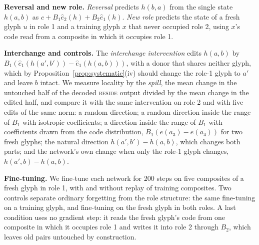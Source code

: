 \documentclass[10pt]{article}
\theoremstyle{plain}
\theoremstyle{remark}
\begin{document}
\textbf{Reversal and new role.} \emph{Reversal} predicts $h(b, a)$ from the single state $h(a, b)$ as $c + B_1 \hat{e}_2(h) + B_2 \hat{e}_1(h)$. \emph{New role} predicts the state of a fresh glyph $u$ in role 1 and a training glyph $x$ that never occupied role 2, using $x$'s code read from a composite in which it occupies role 1.

\textbf{Interchange and controls.} The \emph{interchange intervention} edits $h(a, b)$ by $B_1(\hat{e}_1(h(a', b')) - \hat{e}_1(h(a, b)))$, with a donor that shares neither glyph, which by Proposition~\ref{prop:systematic}(iv) should change the role-1 glyph to $a'$ and leave $b$ intact. We measure locality by the \emph{spill}, the mean change in the untouched half of the decoded \textsc{beside} output divided by the mean change in the edited half, and compare it with the same intervention on role 2 and with five edits of the same norm: a random direction; a random direction inside the range of $B_1$ with isotropic coefficients; a direction inside the range of $B_1$ with coefficients drawn from the code distribution, $B_1(e(a_3) - e(a_4))$ for two fresh glyphs; the natural direction $h(a', b') - h(a, b)$, which changes both parts; and the network's own change when only the role-1 glyph changes, $h(a', b) - h(a, b)$.

\textbf{Fine-tuning.} We fine-tune each network for 200 steps on five composites of a fresh glyph in role 1, with and without replay of training composites. Two controls separate ordinary forgetting from the role structure: the same fine-tuning on a training glyph, and fine-tuning on the fresh glyph in both roles. A last condition uses no gradient step: it reads the fresh glyph's code from one composite in which it occupies role 1 and writes it into role 2 through $B_2$, which leaves old pairs untouched by construction.
\end{document}
